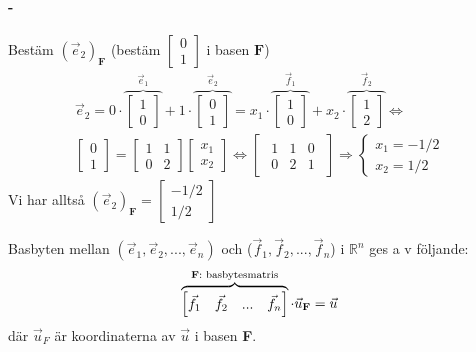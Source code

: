 \begin{Ex}
	\paragraph{-} %
	\label{par:_}
	Bestäm $(\vec{e}_2)_\mathbf{F}$ (bestäm $\begin{bmatrix} 0\\1 \end{bmatrix}$ i basen $\mathbf{F}$)
	\begin{gather*}
		\vec{e}_2 = 0 \cdot \overbrace{\begin{bmatrix} 1\\0 \end{bmatrix}}^{\vec{e}_1} + 1 \cdot \overbrace{\begin{bmatrix} 0\\1 \end{bmatrix}}^{\vec{e}_2} = x_1 \cdot \overbrace{\begin{bmatrix} 1\\0 \end{bmatrix}}^{\vec{f}_1} + x_2 \cdot \overbrace{\begin{bmatrix} 1\\2 \end{bmatrix}}^{\vec{f}_2} \Leftrightarrow\\
		\begin{bmatrix} 0\\1 \end{bmatrix} = \begin{bmatrix} 1&1\\0&2 \end{bmatrix} \begin{bmatrix} x_1\\x_2 \end{bmatrix} \Leftrightarrow \begin{bmatrix}
		\begin{array}{cc|c}
		    1&1&0\\
		    0&2&1
		\end{array}
		\end{bmatrix} \Rightarrow
		\begin{cases}
			x_1 = -1/2\\
			x_2 = 1/2
		\end{cases}
	\end{gather*}
	Vi har alltså $(\vec{e}_2)_\mathbf{F} = \begin{bmatrix} -1/2\\1/2 \end{bmatrix}$
\end{Ex}
Basbyten mellan $(\vec{e}_1, \vec{e}_2,...,\vec{e}_n)$ och ($\vec{f}_1, \vec{f}_2,...,\vec{f}_n$) i $\mathbb{R}^n$ ges a v följande:
\[
\overbrace{\begin{bmatrix} \vec{f}_1 & \vec{f}_2 &...&\vec{f}_n \end{bmatrix}}^\text{\textbf{F}: basbytesmatris} \cdot \vec{u}_{\mathbf{F}} = \vec{u}
\]
där $\vec{u}_F$ är koordinaterna av $\vec{u}$ i basen \textbf{F}.
